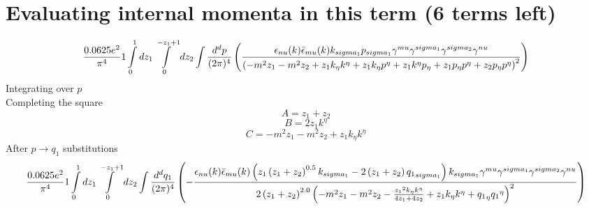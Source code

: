 \section*{Evaluating internal momenta in this term (6 terms left)}
\begin{dmath}\frac{0.0625 e^{2}}{\pi^{4}}1\int\limits_{ 0 }^{ 1 } d{ z_{ 1 } }\int\limits_{ 0 }^{ - { z_{ 1 } } + 1 } d{ z_{ 2 } }\int\frac{d^d p }{ (2\pi)^4 }\left(\frac{\epsilon_{ \\nu }({ k }) \bar{\epsilon}_{ \\mu }({ k }) { { k }_{ \\sigma_1 } } { { p }_{ \\sigma_1 } } { \gamma^{ \\mu } } { \gamma^{ \\sigma_1 } } { \gamma^{ \\sigma_2 } } { \gamma^{ \\nu } }}{\left(- m^{2} { z_{ 1 } } - m^{2} { z_{ 2 } } + { z_{ 1 } } { { k }_{ \eta } } { { k }^{ \eta } } + { z_{ 1 } } { { k }_{ \eta } } { { p }^{ \eta } } + { z_{ 1 } } { { k }^{ \eta } } { { p }_{ \eta } } + { z_{ 1 } } { { p }_{ \eta } } { { p }^{ \eta } } + { z_{ 2 } } { { p }_{ \eta } } { { p }^{ \eta } }\right)^{2}}\right)\end{dmath}
Integrating over $p$\\
Completing the square\
\begin{dmath}A = { z_{ 1 } } + { z_{ 2 } }\end{dmath}
\begin{dmath}B = 2 { z_{ 1 } } { { k }^{ \eta } }\end{dmath}
\begin{dmath}C = - m^{2} { z_{ 1 } } - m^{2} { z_{ 2 } } + { z_{ 1 } } { { k }_{ \eta } } { { k }^{ \eta } }\end{dmath}
After $p \to q_1$ substitutions
\begin{dmath}\frac{0.0625 e^{2}}{\pi^{4}}1\int\limits_{ 0 }^{ 1 } d{ z_{ 1 } }\int\limits_{ 0 }^{ - { z_{ 1 } } + 1 } d{ z_{ 2 } }\int\frac{d^d q_1 }{ (2\pi)^4 }\left(- \frac{\epsilon_{ \\nu }({ k }) \bar{\epsilon}_{ \\mu }({ k }) \left({ z_{ 1 } } \left({ z_{ 1 } } + { z_{ 2 } }\right)^{0.5} { { k }_{ \\sigma_1 } } - 2 \left({ z_{ 1 } } + { z_{ 2 } }\right) { { q_1 }_{ \\sigma_1 } }\right) { { k }_{ \\sigma_1 } } { \gamma^{ \\mu } } { \gamma^{ \\sigma_1 } } { \gamma^{ \\sigma_2 } } { \gamma^{ \\nu } }}{2 \left({ z_{ 1 } } + { z_{ 2 } }\right)^{2.0} \left(- m^{2} { z_{ 1 } } - m^{2} { z_{ 2 } } - \frac{{ z_{ 1 } }^{2} { { k }_{ \eta } } { { k }^{ \eta } }}{4 { z_{ 1 } } + 4 { z_{ 2 } }} + { z_{ 1 } } { { k }_{ \eta } } { { k }^{ \eta } } + { { q_1 }_{ \eta } } { { q_1 }^{ \eta } }\right)^{2}}\right)\end{dmath}
